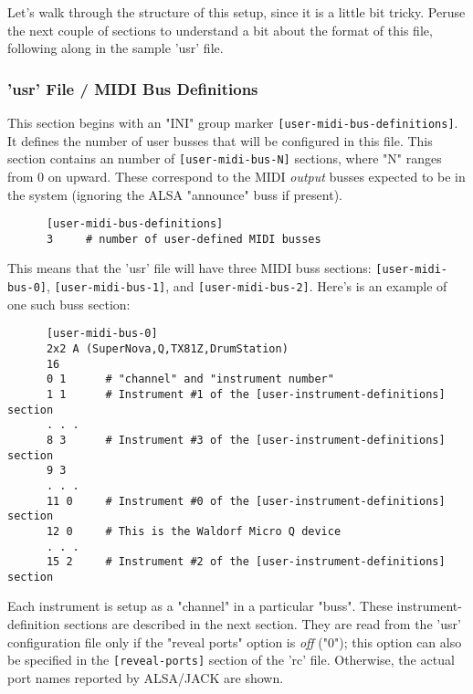    Let's walk through the structure of this setup, since it is a little bit
   tricky.  Peruse the next couple of sections to understand a bit about the
   format of this file, following along in the sample 'usr' file.

\subsubsection{'usr' File / MIDI Bus Definitions}
\label{subsubsec:usr_file_midi_bus_definitions}

   This section begins with an
   "INI" group marker \texttt{[user-midi-bus-definitions]}.
   It defines the number of user busses that will be configured in this file.
   This section contains an number
   of \texttt{[user-midi-bus-N]} sections, where "N" ranges from 0 on upward.
   These correspond to the MIDI \textsl{output}
   busses expected to be in the system (ignoring the ALSA "announce" buss if
   present).

   \begin{verbatim}
      [user-midi-bus-definitions]
      3     # number of user-defined MIDI busses
   \end{verbatim}

   This means that the 'usr' file will have three MIDI buss
   sections:
   \texttt{[user-midi-bus-0]},
   \texttt{[user-midi-bus-1]}, and
   \texttt{[user-midi-bus-2]}.
   Here's is an example of one such buss section:

   \begin{verbatim}
      [user-midi-bus-0]
      2x2 A (SuperNova,Q,TX81Z,DrumStation)
      16
      0 1      # "channel" and "instrument number"
      1 1      # Instrument #1 of the [user-instrument-definitions] section
      . . .
      8 3      # Instrument #3 of the [user-instrument-definitions] section
      9 3
      . . .
      11 0     # Instrument #0 of the [user-instrument-definitions] section
      12 0     # This is the Waldorf Micro Q device
      . . .
      15 2     # Instrument #2 of the [user-instrument-definitions] section
   \end{verbatim}

   Each instrument is setup as a "channel" in a particular "buss".
   These instrument-definition sections are described in the next section.
   They are read from the 'usr' configuration file only if
   the "reveal ports" option is \textsl{off} ("0");
   this option can also be specified in the
   \texttt{[reveal-ports]} section of the 'rc' file.
   Otherwise, the actual port names reported by ALSA/JACK are shown.

